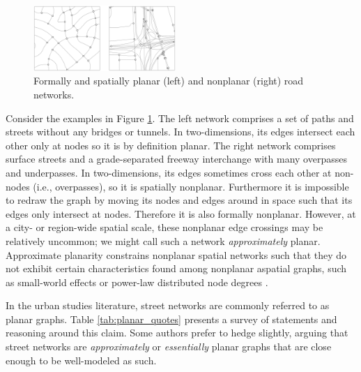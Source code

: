 \documentclass[Afour,sageh,times]{sagej}
\begin{document}
\begin{figure}[tbp]
	\center
	\includegraphics[width=0.48\textwidth]{planar_vs_not.png}
	\caption{Formally and spatially planar (left) and nonplanar (right) road networks.}
	\label{fig:planar_vs_not}
\end{figure}

Consider the examples in Figure \ref{fig:planar_vs_not}. The left network comprises a set of paths and streets without any bridges or tunnels. In two-dimensions, its edges intersect each other only at nodes so it is by definition planar. The right network comprises surface streets and a grade-separated freeway interchange with many overpasses and underpasses. In two-dimensions, its edges sometimes cross each other at non-nodes (i.e., overpasses), so it is spatially nonplanar. Furthermore it is impossible to redraw the graph by moving its nodes and edges around in space such that its edges only intersect at nodes. Therefore it is also formally nonplanar. However, at a city- or region-wide spatial scale, these nonplanar edge crossings may be relatively uncommon; we might call such a network \emph{approximately} planar. Approximate planarity constrains nonplanar spatial networks such that they do not exhibit certain characteristics found among nonplanar aspatial graphs, such as small-world effects or power-law distributed node degrees \citep{fischer_spatial_2014}.

In the urban studies literature, street networks are commonly referred to as planar graphs. Table \ref{tab:planar_quotes} presents a survey of statements and reasoning around this claim. Some authors prefer to hedge slightly, arguing that street networks are \emph{approximately} or \emph{essentially} planar graphs that are close enough to be well-modeled as such.
\end{document}
